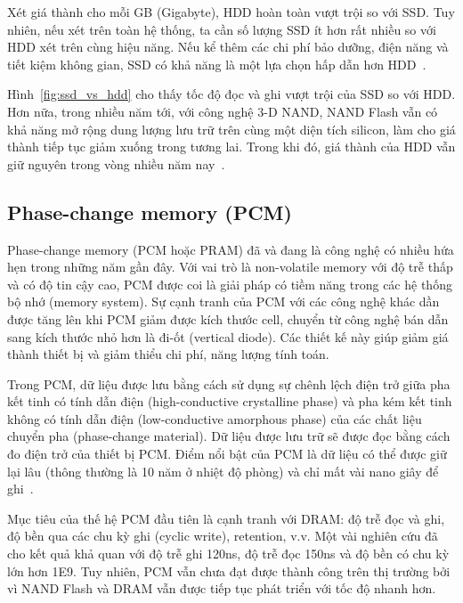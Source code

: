 Xét giá thành cho mỗi GB (Gigabyte), HDD hoàn toàn vượt trội so với SSD. Tuy
nhiên, nếu xét trên toàn hệ thống, ta cần số lượng SSD ít hơn rất nhiều so với
HDD xét trên cùng hiệu năng. Nếu kể thêm các chi phí bảo dưỡng, điện năng
và tiết kiệm không gian, SSD có khả năng là một lựa chọn hấp dẫn hơn
HDD~\cite{wongMarketApplicationsNAND2010}.

Hình~\ref{fig:ssd_vs_hdd} cho thấy tốc độ đọc và ghi vượt trội của SSD so với
HDD. Hơn nữa, trong nhiều năm tới, với công nghệ 3-D NAND, NAND Flash vẫn có khả
năng mở rộng dung lượng lưu trữ trên cùng một diện tích silicon, làm cho giá
thành tiếp tục giảm xuống trong tương lai. Trong khi đó, giá thành của HDD vẫn
giữ nguyên trong vòng nhiều năm
nay~\cite{monziocompagnoniReviewingEvolutionNAND2017}.



\subsection{Phase-change memory (PCM)}
Phase-change memory (PCM hoặc PRAM) đã và đang là công nghệ có nhiều hứa hẹn
trong những năm gần đây. Với vai trò là non-volatile memory với độ trễ thấp và
có độ tin cậy cao, PCM được coi là giải pháp có tiềm năng trong các hệ thống bộ
nhớ (memory system). Sự cạnh tranh của PCM với các công nghệ khác dần được tăng
lên khi PCM giảm được kích thước cell, chuyển từ công nghệ bán dẫn sang kích
thước nhỏ hơn là đi-ốt (vertical diode). Các thiết kế này giúp giảm giá thành
thiết bị và giảm thiểu chi phí, năng lượng tính toán.

Trong PCM, dữ liệu được lưu bằng cách sử dụng sự chênh lệch điện trở giữa pha
kết tinh có tính dẫn điện (high-conductive crystalline phase) và pha kém kết
tinh không có tính dẫn điện (low-conductive amorphous phase) của các chất liệu
chuyển pha (phase-change material). Dữ liệu được lưu trữ sẽ được đọc bằng cách
đo điện trở của thiết bị PCM. Điểm nổi bật của PCM là dữ liệu có thể được giữ
lại lâu (thông thường là 10 năm ở nhiệt độ phòng) và chỉ mất vài nano giây để
ghi~\cite{galloOverviewPhasechangeMemory2020}.

Mục tiêu của thế hệ PCM đầu tiên là cạnh tranh với DRAM: độ trễ đọc và ghi, độ
bền qua các chu kỳ ghi (cyclic write), retention, v.v. Một vài nghiên cứu đã cho
kết quả khả quan với độ trễ ghi 120ns, độ trễ đọc 150ns và độ bền có chu kỳ lớn
hơn 1E9. Tuy nhiên, PCM vẫn chưa đạt được thành công trên thị trường bởi vì NAND
Flash và DRAM vẫn được tiếp tục phát triển với tốc độ nhanh hơn.

